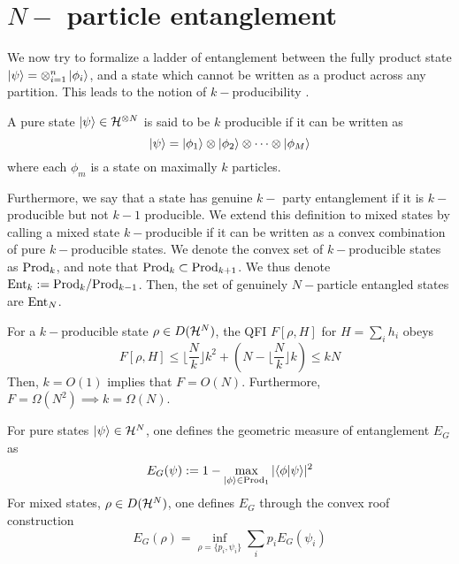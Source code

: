 \section{$N-$ particle entanglement}
We now try to formalize a ladder of entanglement between the fully product state $\ket{\psi} = \otimes_{i=1}^n\ket{\phi_i}$, and a state which cannot be written as a product across any partition. This leads to the notion of $k-$producibility \cite{multipartite_spinchains}.

\begin{definition}[$k-$producibility]
    A pure state $\ket{\psi}\in\mathcal{H}^{\otimes N}$ is said to be $k$ producible if it can be written as 
    \begin{equation}
        \ket{\psi} = \ket{\phi_1} \otimes \ket{\phi_2} \otimes \dots \otimes \ket{\phi_M}
    \end{equation}
    where each $\phi_m$ is a state on maximally $k$ particles.
\end{definition}
Furthermore, we say that a state has genuine $k-$ party entanglement if it is $k-$producible but not $k-1$ producible. We extend this definition to mixed states by calling a mixed state $k-$producible if it can be written as a convex combination of pure $k-$producible states. We denote the convex set of $k-$producible states as $\text{Prod}_k$, and note that $\text{Prod}_k \subset \text{Prod}_{k+1}$. We thus denote $\text{Ent}_k := \text{Prod}_k / \text{Prod}_{k-1}$. Then, the set of genuinely $N-$particle entangled states are $\text{Ent}_N$.


\begin{lemma}
    For a $k-$producible state $\rho \in D(\mathcal{H}^N)$, the QFI $F[\rho,H]$ for $H = \sum_i h_i$ obeys
    \begin{equation}
        F[\rho,H] \leq \lfloor\frac{N}{k}\rfloor k^2 + \left(N - \lfloor\frac{N}{k}\rfloor k\right) \leq k N 
    \end{equation}
    Then, $k=O(1)$ implies that $F= O(N)$. Furthermore, $F = \Omega(N^2) \implies k = \Omega(N)$. 
\end{lemma}


For pure states $\ket{\psi}\in\mathcal{H}^N$, one defines the geometric measure of entanglement $E_G$ as 
\begin{equation}
    E_G(\psi) := 1- \max_{\ket{\phi}\in\text{Prod}_1}|\langle \phi|\psi\rangle|^2 
\end{equation}
For mixed states, $\rho \in D(\mathcal{H}^N)$, one defines $E_G$ through the convex roof construction 
\begin{equation}
    E_G(\rho) = \inf_{\rho = \{p_i,\psi_i\}} \sum_i p_i E_G(\psi_i)
\end{equation}


